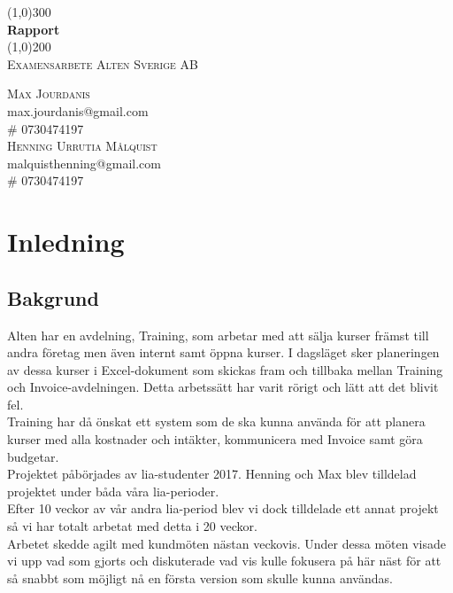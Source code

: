 \documentclass{article}
\begin{document}
\begin{titlepage}
    \begin{center}
        \line(1,0){300}\\
        \huge{\bfseries Rapport  }\\
        \line(1,0){200}\\
        [1cm]
        \textsc{\LARGE Examensarbete Alten Sverige AB }\\
        [13cm]
    \end{center}
    \begin{flushright}
        \textsc{\Large Max Jourdanis \\}
        max.jourdanis@gmail.com\\
        \# 0730474197\\
        [4pt]
        \textsc{\Large Henning Urrutia Målquist \\}
        malquisthenning@gmail.com\\
        \# 0730474197
        
    \end{flushright}
    \end{titlepage}
\tableofcontents 

    \newpage
    
    \thispagestyle{empty}

    \cleardoublepage

    \setcounter{page}{1}
    
\section{Inledning}
    \subsection{Bakgrund}
    Alten har en avdelning, Training, som arbetar med att sälja kurser främst
    till andra företag men även internt samt öppna kurser. I dagsläget sker
    planeringen av dessa kurser i Excel-dokument som skickas fram och tillbaka
    mellan Training och Invoice-avdelningen. Detta arbetssätt har varit rörigt
    och lätt att det blivit fel.\\
    Training har då önskat ett system som de ska kunna använda för att planera
    kurser med alla kostnader och intäkter, kommunicera med Invoice samt göra
    budgetar.\\
    Projektet påbörjades av lia-studenter 2017. Henning och Max blev tilldelad
    projektet under båda våra lia-perioder.\\
    Efter 10 veckor av vår andra lia-period blev vi dock tilldelade ett annat
    projekt så vi har totalt arbetat med detta i 20 veckor.\\
    Arbetet skedde agilt med kundmöten nästan veckovis. Under dessa möten visade
    vi upp vad som gjorts och diskuterade vad vis kulle fokusera på här näst för
    att så snabbt som möjligt nå en första version som skulle kunna användas. 
\end{document}
